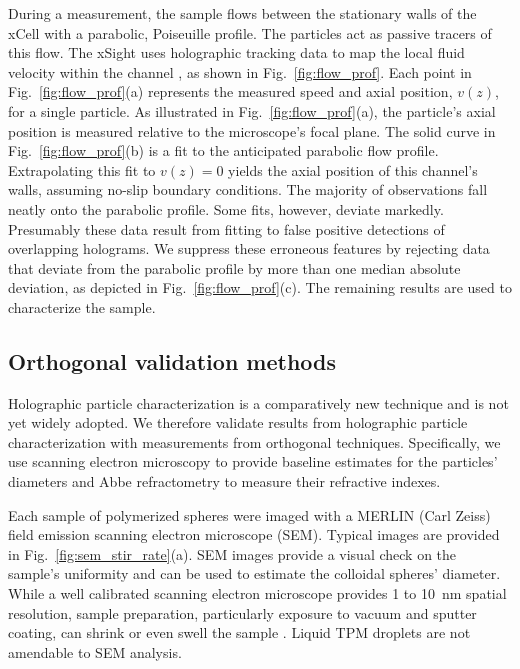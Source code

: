 During a measurement, the sample flows between the stationary walls of the xCell
with a parabolic, Poiseuille profile.
The particles act as passive tracers of this flow.
The xSight uses holographic tracking data to map the local fluid velocity within
the channel \cite{cheong10a}, as shown in Fig.~\ref{fig:flow_prof}.
Each point in Fig.~\ref{fig:flow_prof}(a) represents the measured speed
and axial position, $v(z)$, for a single particle.
As illustrated in Fig.~\ref{fig:flow_prof}(a),
the particle's axial position is measured relative to the microscope's
focal plane. The solid curve in Fig.~\ref{fig:flow_prof}(b) is a fit to the
anticipated parabolic flow profile. Extrapolating this fit to $v(z)=0$ yields the
axial position of this channel's walls, assuming
no-slip boundary conditions. 
The majority of observations fall neatly onto the parabolic profile.
Some fits, however, deviate markedly. Presumably these data result from fitting
to false positive detections of overlapping holograms.
We suppress these erroneous features by rejecting data that deviate from
the parabolic profile by more than one median absolute deviation,
as depicted in Fig.~\ref{fig:flow_prof}(c). The remaining results are used
to characterize the sample.

\subsection{Orthogonal validation methods}

Holographic particle characterization is a comparatively new technique
and is not yet widely adopted. We therefore validate results from
holographic particle characterization with measurements from orthogonal
techniques.
Specifically, we use scanning electron microscopy to provide baseline estimates for the
particles' diameters and Abbe refractometry to measure their refractive indexes.

Each sample of polymerized spheres were imaged with a MERLIN (Carl Zeiss) field
emission scanning electron microscope (SEM).
Typical images are provided in Fig.~\ref{fig:sem_stir_rate}(a).
SEM images provide a visual check on the sample's uniformity
and can be used to estimate the colloidal spheres' diameter.
While a well calibrated scanning
electron microscope provides \num{1} to \SI{10}{\nm} spatial resolution, sample
preparation, particularly exposure to vacuum and sputter coating, can shrink or
even swell the sample \cite{yamada85,jung02}. Liquid TPM droplets
are not amendable to SEM analysis.

